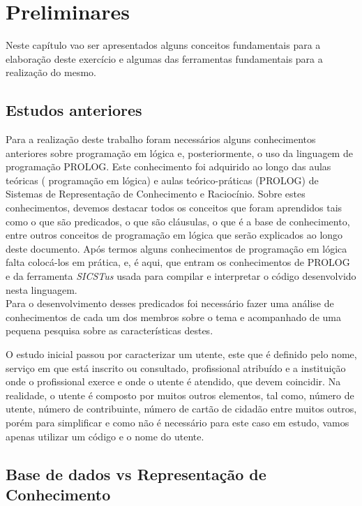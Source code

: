 \chapter{Preliminares}
\label{cap:p2}
Neste capítulo vao ser apresentados alguns conceitos fundamentais para a elaboração deste
exercício e algumas das ferramentas fundamentais para a realização do mesmo.


\section{Estudos anteriores}
\label{p2:estudp}
Para a realização deste trabalho foram necessários alguns conhecimentos anteriores sobre programação em lógica e, posteriormente, o uso da linguagem de programação PROLOG.
Este conhecimento foi adquirido ao longo das aulas teóricas ( programação em lógica) e aulas
teórico-práticas (PROLOG) de Sistemas de Representação de Conhecimento e Raciocínio.
Sobre estes conhecimentos, devemos destacar todos os conceitos que foram aprendidos tais
como o que são predicados, o que são cláusulas, o que é a base de conhecimento, entre outros
conceitos de programação em lógica que serão explicados ao longo deste documento.
Após termos alguns conhecimentos de programação em lógica falta colocá-los em prática,
e, é aqui, que entram os conhecimentos de PROLOG e da ferramenta \textit{SICSTus} usada para
compilar e interpretar o código desenvolvido nesta linguagem.
\\

Para o desenvolvimento desses predicados foi necessário fazer uma análise de conhecimentos de cada um dos membros sobre o tema e acompanhado de uma pequena pesquisa sobre as características destes.

O estudo inicial passou por caracterizar um utente, este que é definido pelo nome, serviço em que está inscrito ou consultado, profissional atribuído e a instituição onde o profissional exerce e onde o utente é atendido, que devem coincidir. Na realidade, o utente é composto por muitos outros elementos, tal como, número de utente, número de contribuinte, número de cartão de cidadão entre muitos outros, porém para simplificar e como não é necessário para este caso em estudo, vamos apenas utilizar um código e o nome do utente. 
\\




\section{Base de dados vs Representação de Conhecimento}
\label{p2:bdrepreconh}


